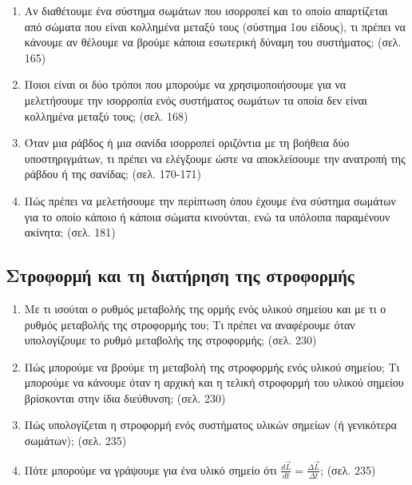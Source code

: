 \documentclass{article}
\begin{document}
\begin{enumerate}
      \item Αν διαθέτουμε ένα σύστημα σωμάτων που ισορροπεί και το οποίο απαρτίζεται από σώματα που είναι κολλημένα μεταξύ τους (σύστημα 1ου είδους), τι πρέπει να κάνουμε αν θέλουμε να βρούμε κάποια εσωτερική δύναμη του συστήματος; (σελ. 165)
      \item Ποιοι είναι οι δύο τρόποι που μπορούμε να χρησιμοποιήσουμε για να μελετήσουμε την ισορροπία ενός συστήματος σωμάτων τα οποία δεν είναι κολλημένα μεταξύ τους; (σελ. 168)
      \item Όταν μια ράβδος ή μια σανίδα ισορροπεί οριζόντια με τη βοήθεια δύο υποστηριγμάτων, τι πρέπει να ελέγξουμε ώστε να αποκλείσουμε την ανατροπή της ράβδου ή της σανίδας; (σελ. 170-171)
      \item Πώς πρέπει να μελετήσουμε την περίπτωση όπου έχουμε ένα σύστημα σωμάτων για το οποίο κάποιο ή κάποια σώματα κινούνται, ενώ τα υπόλοιπα παραμένουν ακίνητα; (σελ. 181)
\end{enumerate}

\subsection{Στροφορμή και τη διατήρηση της στροφορμής}

\begin{enumerate}
      \item Με τι ισούται ο ρυθμός μεταβολής της ορμής ενός υλικού σημείου και με τι ο ρυθμός μεταβολής της στροφορμής του; Τι πρέπει να αναφέρουμε όταν υπολογίζουμε το ρυθμό μεταβολής της στροφορμής; (σελ. 230)
      \item Πώς μπορούμε να βρούμε τη μεταβολή της στροφορμής ενός υλικού σημείου; Τι μπορούμε να κάνουμε όταν η αρχική και η τελική στροφορμή του υλικού σημείου βρίσκονται στην ίδια διεύθυνση; (σελ. 230)
      \item Πώς υπολογίζεται η στροφορμή ενός συστήματος υλικών σημείων (ή γενικότερα σωμάτων); (σελ. 235)
      \item Πότε μπορούμε να γράψουμε για ένα υλικό σημείο ότι $\frac{d\vec{L}}{dt} = \frac{\Delta\vec{L}}{\Delta t}$; (σελ. 235)
\end{enumerate}
\end{document}
